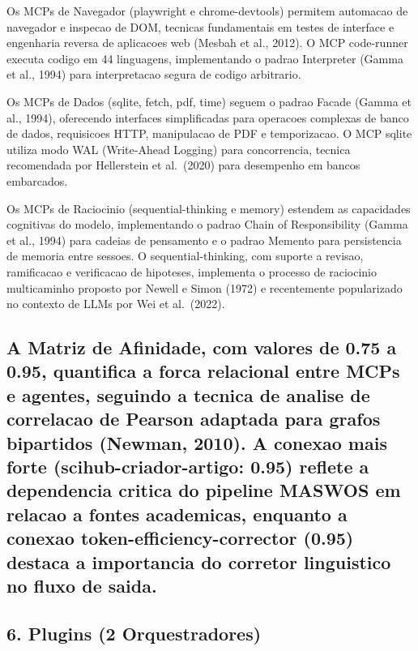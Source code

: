 \documentclass[
  12pt,
]{article}
\begin{document}
Os MCPs de Navegador (playwright e chrome-devtools) permitem automacao
de navegador e inspecao de DOM, tecnicas fundamentais em testes de
interface e engenharia reversa de aplicacoes web (Mesbah et al., 2012).
O MCP code-runner executa codigo em 44 linguagens, implementando o
padrao Interpreter (Gamma et al., 1994) para interpretacao segura de
codigo arbitrario.

Os MCPs de Dados (sqlite, fetch, pdf, time) seguem o padrao Facade
(Gamma et al., 1994), oferecendo interfaces simplificadas para operacoes
complexas de banco de dados, requisicoes HTTP, manipulacao de PDF e
temporizacao. O MCP sqlite utiliza modo WAL (Write-Ahead Logging) para
concorrencia, tecnica recomendada por Hellerstein et al.~(2020) para
desempenho em bancos embarcados.

Os MCPs de Raciocinio (sequential-thinking e memory) estendem as
capacidades cognitivas do modelo, implementando o padrao Chain of
Responsibility (Gamma et al., 1994) para cadeias de pensamento e o
padrao Memento para persistencia de memoria entre sessoes. O
sequential-thinking, com suporte a revisao, ramificacao e verificacao de
hipoteses, implementa o processo de raciocinio multicaminho proposto por
Newell e Simon (1972) e recentemente popularizado no contexto de LLMs
por Wei et al.~(2022).

\subsection{A Matriz de Afinidade, com valores de 0.75 a 0.95,
quantifica a forca relacional entre MCPs e agentes, seguindo a tecnica
de analise de correlacao de Pearson adaptada para grafos bipartidos
(Newman, 2010). A conexao mais forte (scihub-criador-artigo: 0.95)
reflete a dependencia critica do pipeline MASWOS em relacao a fontes
academicas, enquanto a conexao token-efficiency-corrector (0.95) destaca
a importancia do corretor linguistico no fluxo de
saida.}\label{a-matriz-de-afinidade-com-valores-de-0.75-a-0.95-quantifica-a-forca-relacional-entre-mcps-e-agentes-seguindo-a-tecnica-de-analise-de-correlacao-de-pearson-adaptada-para-grafos-bipartidos-newman-2010.-a-conexao-mais-forte-scihub-criador-artigo-0.95-reflete-a-dependencia-critica-do-pipeline-maswos-em-relacao-a-fontes-academicas-enquanto-a-conexao-token-efficiency-corrector-0.95-destaca-a-importancia-do-corretor-linguistico-no-fluxo-de-saida.}

\subsection{6. Plugins (2
Orquestradores)}\label{plugins-2-orquestradores}
\end{document}
